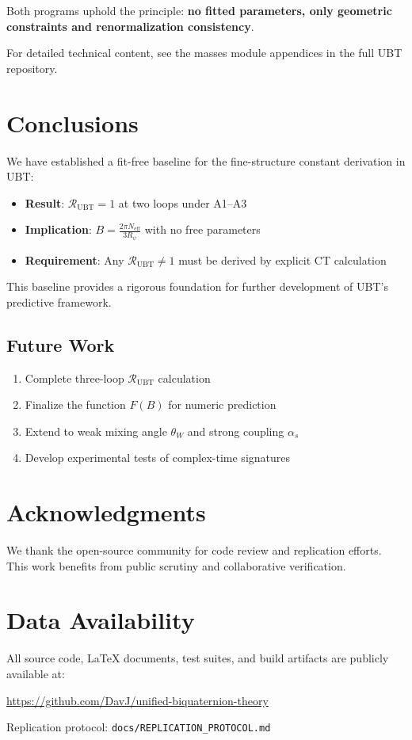 \documentclass[11pt,a4paper]{article}
\begin{document}
Both programs uphold the principle: \textbf{no fitted parameters, only geometric constraints and renormalization consistency}.

For detailed technical content, see the masses module appendices in the full UBT repository.

\section{Conclusions}

We have established a fit-free baseline for the fine-structure constant derivation in UBT:
\begin{itemize}
\item \textbf{Result}: $\mathcal{R}_{\mathrm{UBT}} = 1$ at two loops under A1--A3
\item \textbf{Implication}: $B = \frac{2\pi N_{\mathrm{eff}}}{3R_\psi}$ with no free parameters
\item \textbf{Requirement}: Any $\mathcal{R}_{\mathrm{UBT}} \neq 1$ must be derived by explicit CT calculation
\end{itemize}

This baseline provides a rigorous foundation for further development of UBT's predictive framework.

\subsection{Future Work}

\begin{enumerate}
\item Complete three-loop $\mathcal{R}_{\mathrm{UBT}}$ calculation
\item Finalize the function $F(B)$ for numeric prediction
\item Extend to weak mixing angle $\theta_W$ and strong coupling $\alpha_s$
\item Develop experimental tests of complex-time signatures
\end{enumerate}

\section*{Acknowledgments}

We thank the open-source community for code review and replication efforts. This work benefits from public scrutiny and collaborative verification.

\section*{Data Availability}

All source code, LaTeX documents, test suites, and build artifacts are publicly available at:

\url{https://github.com/DavJ/unified-biquaternion-theory}

Replication protocol: \texttt{docs/REPLICATION\_PROTOCOL.md}



\end{document}
